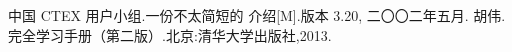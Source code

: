 \begin{thebibliography}{99}
\setlength{\itemsep}{-1mm}
\rm\wuhao 
{}中国 CTEX 用户小组.一份不太简短的 \LaTeXe 介绍[M].版本 3.20, 二〇〇二年五月.
胡伟. \LaTeXe 完全学习手册（第二版）.北京:清华大学出版社,2013.

\end{thebibliography}